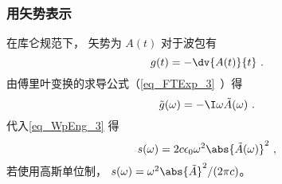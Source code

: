 \subsubsection{用矢势表示}
在库仑规范下， 矢势为 $A(t)$ 对于波包有
\begin{equation}
g(t) = -\dv{A(t)}{t}~.
\end{equation}
由傅里叶变换的求导公式（\autoref{eq_FTExp_3}~）得
\begin{equation}\label{eq_WpEng_4}
\tilde g(\omega) = -\I \omega \tilde A(\omega)~.
\end{equation}
代入\autoref{eq_WpEng_3} 得
\begin{equation}\label{eq_WpEng_5}
s(\omega) = 2c\epsilon_0 \omega^2 \abs{\tilde A(\omega)}^2~,
\end{equation}
若使用高斯单位制， $s(\omega) = \omega^2 \abs{\tilde A}^2/(2\pi c)$。
